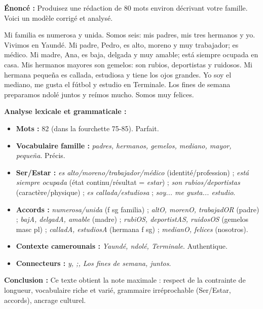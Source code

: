 \documentclass[11pt]{article}
\begin{document}
\begin{exoresolu}
\textbf{Énoncé :} Produisez une rédaction de 80 mots environ décrivant votre famille. Voici un modèle corrigé et analysé.
\tcblower
\begin{textebox}
Mi familia es numerosa y unida. Somos seis: mis padres, mis tres hermanos y yo. Vivimos en Yaundé. Mi padre, Pedro, es alto, moreno y muy trabajador; es médico. Mi madre, Ana, es baja, delgada y muy amable; está siempre ocupada en casa. Mis hermanos mayores son gemelos: son rubios, deportistas y ruidosos. Mi hermana pequeña es callada, estudiosa y tiene los ojos grandes. Yo soy el mediano, me gusta el fútbol y estudio en Terminale. Los fines de semana preparamos ndolé juntos y reímos mucho. Somos muy felices.
\end{textebox}
\textbf{Analyse lexicale et grammaticale :}
\begin{itemize}
    \item \textbf{Mots :} 82 (dans la fourchette 75-85). Parfait.
    \item \textbf{Vocabulaire famille :} \emph{padres, hermanos, gemelos, mediano, mayor, pequeña}. Précis.
    \item \textbf{Ser/Estar :} \emph{es alto/moreno/trabajador/médico} (identité/profession) ; \emph{está siempre ocupada} (état continu/résultat = \emph{estar}) ; \emph{son rubios/deportistas} (caractère/physique) ; \emph{es callada/estudiosa} ; \emph{soy... me gusta... estudio}.
    \item \textbf{Accords :} \emph{numerosa/unida} (f sg familia) ; \emph{altO, morenO, trabajadOR} (padre) ; \emph{bajA, delgadA, amable} (madre) ; \emph{rubiOS, deportistAS, ruidosOS} (gemelos masc pl) ; \emph{calladA, estudiosA} (hermana f sg) ; \emph{medianO, felices} (nosotros).
    \item \textbf{Contexte camerounais :} \emph{Yaundé, ndolé, Terminale}. Authentique.
    \item \textbf{Connecteurs :} \emph{y, ;, Los fines de semana, juntos}.
\end{itemize}
\textbf{Conclusion :} Ce texte obtient la note maximale : respect de la contrainte de longueur, vocabulaire riche et varié, grammaire irréprochable (Ser/Estar, accords), ancrage culturel.
\end{exoresolu}
\end{document}
